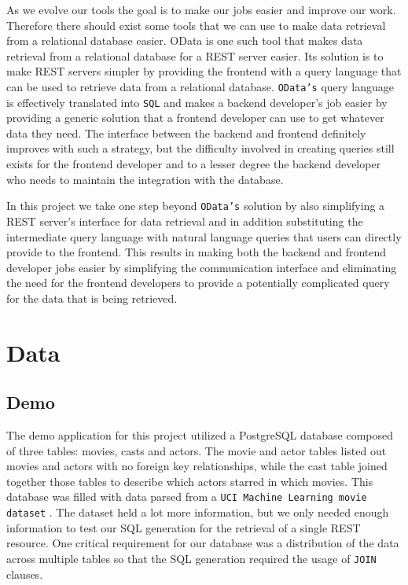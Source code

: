 \documentclass[11pt]{article}
\begin{document}
As we evolve our tools the goal is to make our jobs easier and improve our work. Therefore there should exist some tools that we can use to make data retrieval from a relational database easier. OData \citep{odata} is one such tool that makes data retrieval from a relational database for a REST server easier. Its solution is to make REST servers simpler by providing the frontend with a query language that can be used to retrieve data from a relational database. \texttt{OData's} query language is effectively translated into \texttt{SQL} and makes a backend developer's job easier by providing a generic solution that a frontend developer can use to get whatever data they need. The interface between the backend and frontend definitely improves with such a strategy, but the difficulty involved in creating queries still exists for the frontend developer and to a lesser degree the backend developer who needs to maintain the integration with the database.

In this project we take one step beyond \texttt{OData's} solution by also simplifying a REST server's interface for data retrieval and in addition substituting the intermediate query language with natural language queries that users can directly provide to the frontend. This results in making both the backend and frontend developer jobs easier by simplifying the communication interface and eliminating the need for the frontend developers to provide a potentially complicated query for the data that is being retrieved.

\section{Data}

\subsection{Demo}

The demo application for this project utilized a PostgreSQL database composed of three tables: movies, casts and actors. The movie and actor tables listed out movies and actors with no foreign key relationships, while the cast table joined together those tables to describe which actors starred in which movies. This database was filled with data parsed from a \texttt{UCI Machine Learning movie dataset} \citep{misc_movie_132}. The dataset held a lot more information, but we only needed enough information to test our SQL generation for the retrieval of a single REST resource. One critical requirement for our database was a distribution of the data across multiple tables so that the SQL generation required the usage of \texttt{JOIN} clauses.
\end{document}
